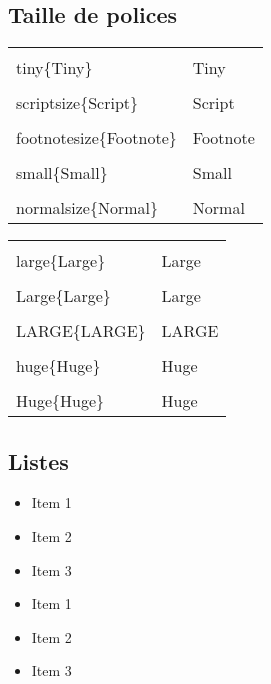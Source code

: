 \documentclass{article}
\begin{document}
\begin{multicols*}{3}
\subsection*{Taille de polices}
\begin{multicols*}{2}
    \begin{tabularx}{\columnwidth}{lX}
        \lstinline{\\tiny\{Tiny\}}             & \tiny{Tiny}             \\
        \lstinline{\\scriptsize\{Script\}}     & \scriptsize{Script}     \\
        \lstinline{\\footnotesize\{Footnote\}} & \footnotesize{Footnote} \\
        \lstinline{\\small\{Small\}}           & \small{Small}           \\
        \lstinline{\\normalsize\{Normal\}}     & \normalsize{Normal}     \\
    \end{tabularx}
    \columnbreak
    \begin{tabularx}{\columnwidth}{lX}
        \lstinline{\\large\{Large\}} & \large{Large} \\
        \lstinline{\\Large\{Large\}} & \Large{Large} \\
        \lstinline{\\LARGE\{LARGE\}} & \LARGE{LARGE} \\
        \lstinline{\\huge\{Huge\}}   & \huge{Huge}   \\
        \lstinline{\\Huge\{Huge\}}   & \Huge{Huge}
    \end{tabularx}
\end{multicols*}

\subsection*{Listes}
\begin{minipage}[c]{0.3\linewidth}
    \begin{itemize}
        \item Item 1
        \item Item 2
        \item Item 3
    \end{itemize}
\end{minipage}
\begin{minipage}[c]{0.6\linewidth}
    \begin{latexcode}
        \begin{itemize}
            \item Item 1
            \item Item 2
            \item Item 3 \label{it:item3}
        \end{itemize}
    \end{latexcode}
\end{minipage}


\end{multicols*}
\end{document}
